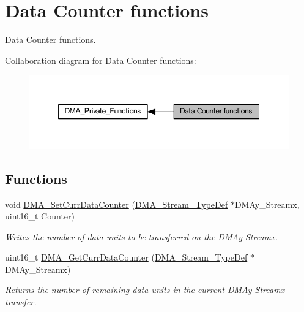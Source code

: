 \hypertarget{group___d_m_a___group2}{}\section{Data Counter functions}
\label{group___d_m_a___group2}


Data Counter functions.  


Collaboration diagram for Data Counter functions\+:
\nopagebreak
\begin{figure}[H]
\begin{center}
\leavevmode
\includegraphics[width=350pt]{group___d_m_a___group2}
\end{center}
\end{figure}
\subsection*{Functions}
\begin{DoxyCompactItemize}
\item 
void \hyperlink{group___d_m_a___group2_ga6a11a2c951cff59b125ba8857d44e3f3}{D\+M\+A\+\_\+\+Set\+Curr\+Data\+Counter} (\hyperlink{struct_d_m_a___stream___type_def}{D\+M\+A\+\_\+\+Stream\+\_\+\+Type\+Def} $\ast$D\+M\+Ay\+\_\+\+Streamx, uint16\+\_\+t Counter)
\begin{DoxyCompactList}\small\item\em Writes the number of data units to be transferred on the D\+M\+Ay Streamx. \end{DoxyCompactList}\item 
uint16\+\_\+t \hyperlink{group___d_m_a___group2_ga4a76444a92423f5f15a4328738d6dc46}{D\+M\+A\+\_\+\+Get\+Curr\+Data\+Counter} (\hyperlink{struct_d_m_a___stream___type_def}{D\+M\+A\+\_\+\+Stream\+\_\+\+Type\+Def} $\ast$D\+M\+Ay\+\_\+\+Streamx)
\begin{DoxyCompactList}\small\item\em Returns the number of remaining data units in the current D\+M\+Ay Streamx transfer. \end{DoxyCompactList}\end{DoxyCompactItemize}


